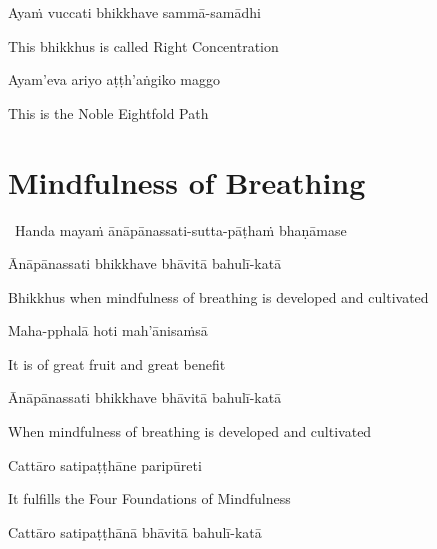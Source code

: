 Ayaṁ vuccati bhikkhave sammā-samādhi

\begin{english}
  This bhikkhus is called Right Concentration
\end{english}

Ayam'eva ariyo aṭṭh'aṅgiko maggo

\begin{english}
  This is the Noble Eightfold Path
\end{english}

\suttaRef{[SN 45.8]}

\enlargethispage{\baselineskip\vspace{-0.5em}}

\section{Mindfulness of Breathing}
\label{mindfulness-of-breathing}

\begin{leader}
  \anglebracketleft\ \hspace{-0.5mm}Handa mayaṁ ānāpānassati-sutta-pāṭhaṁ bhaṇāmase \hspace{-0.5mm}\anglebracketright\
\end{leader}

Ānāpānassati bhikkhave bhāvitā bahulī-katā

\begin{english}
  Bhikkhus when mindfulness of breathing is developed and cultivated
\end{english}

Maha-pphalā hoti mah'ānisaṁsā

\begin{english}
  It is of great fruit and great benefit
\end{english}

Ānāpānassati bhikkhave bhāvitā bahulī-katā

\begin{english}
  When mindfulness of breathing is developed and cultivated
\end{english}

Cattāro satipaṭṭhāne paripūreti

\begin{english}
  It fulfills the Four Foundations of Mindfulness
\end{english}

Cattāro satipaṭṭhānā bhāvitā bahulī-katā

